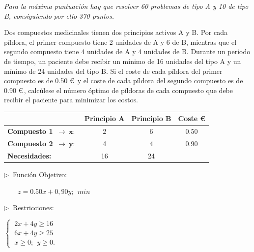 \vspace{5mm} \emph{Para la máxima puntuación hay que resolver 60 problemas de tipo A y 10 de tipo B, consiguiendo por ello 370 puntos.}







\vspace{10mm}
\begin{ejemplo}
\begin{ejer}
	Dos compuestos medicinales tienen dos principios activos A y B. Por cada píldora, el primer compuesto tiene 2 unidades de A y 6 de B, mientras que el segundo compuesto tiene 4 unidades de A y 4 unidades de B. Durante un período de tiempo, un paciente debe recibir un mínimo de 16 unidades del tipo A y un mínimo de 24 unidades del tipo B. Si el coste de cada píldora del primer compuesto es de 0.50 \euro $\,$ y el coste de cada píldora del segundo compuesto es de 0.90 \euro $\,$, calcúlese el número óptimo de píldoras de cada compuesto que debe recibir el paciente para minimizar los costos.
\end{ejer}	
\end{ejemplo}
\vspace{5mm}

\begin{table}[H]
\centering
\begin{tabular}{lccc}
 & \textbf{Principio A} & \textbf{Principio B} & \textbf{Coste \euro} \\ \hline
\textbf{Compuesto 1} $\ \to \ \boldsymbol{ x}:\ $ & 2 & 6 & 0.50 \\
\textbf{Compuesto 2} $\ \to \ \boldsymbol{ y}:\ $ & 4 & 4 & 0.90 \\ \cline{2-3}
\textbf{Necesidades:} & 16 & 24 & 
\end{tabular}
\end{table}

\vspace{5mm} \begin{multicols}{2}
$ \triangleright \ $	Función Objetivo:

$\qquad z=0.50x+0,90y;\ \ min$

$ \triangleright \ $	Restricciones:

$\begin{cases} \ 2x+4y\ge 16 \\ \ 6x+4y\ge 25 \\ \ x\ge 0;\ \ y\ge  0. \end{cases}$ 
 \end{multicols}

